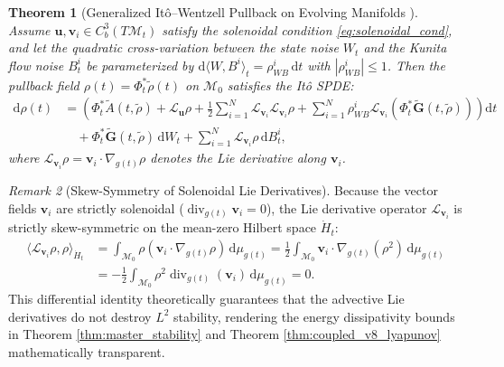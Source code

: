 \documentclass[11pt,a4paper,reqno]{article}
\newtheorem{theorem}{Theorem}[section]
\theoremstyle{definition}
\theoremstyle{remark}
\newtheorem{remark}[theorem]{Remark}
\begin{document}
\begin{theorem}[Generalized It\^o--Wentzell Pullback on Evolving Manifolds \cite{ananda2026stochastic_fluid_v2, krylov2011ito}]\label{thm:ito_wentzell}
Assume $\mathbf{u}, \mathbf{v}_i \in C_b^3(T\mathcal{M}_t)$ satisfy the solenoidal condition \eqref{eq:solenoidal_cond}, and let the quadratic cross-variation between the state noise $W_t$ and the Kunita flow noise $B_t^i$ be parameterized by $\mathrm{d}\langle W, B^i \rangle_t = \rho_{WB}^i\,\mathrm{d}t$ with $|\rho_{WB}^i| \le 1$. Then the pullback field $\rho(t) = \Phi_t^*\tilde{\rho}(t)$ on $\mathcal{M}_0$ satisfies the It\^o SPDE:
\begin{align}\label{eq:ito_wentzell_pullback}
  \mathrm{d}\rho(t) &= \left( \Phi_t^* \tilde{A}(t, \tilde{\rho}) + \mathcal{L}_{\mathbf{u}} \rho + \frac{1}{2} \sum_{i=1}^N \mathcal{L}_{\mathbf{v}_i} \mathcal{L}_{\mathbf{v}_i} \rho + \sum_{i=1}^N \rho_{WB}^i \mathcal{L}_{\mathbf{v}_i} \left(\Phi_t^* \tilde{\mathbf{G}}(t, \tilde{\rho})\right) \right) \mathrm{d}t \nonumber \\
  &\quad + \Phi_t^* \tilde{\mathbf{G}}(t, \tilde{\rho})\,\mathrm{d}W_t + \sum_{i=1}^N \mathcal{L}_{\mathbf{v}_i} \rho \,\mathrm{d}B_t^i,
\end{align}
where $\mathcal{L}_{\mathbf{v}_i}\rho = \mathbf{v}_i \cdot \nabla_{g(t)}\rho$ denotes the Lie derivative along $\mathbf{v}_i$.
\end{theorem}

\begin{remark}[Skew-Symmetry of Solenoidal Lie Derivatives]\label{rem:skew_symmetry}
Because the vector fields $\mathbf{v}_i$ are strictly solenoidal ($\operatorname{div}_{g(t)} \mathbf{v}_i = 0$), the Lie derivative operator $\mathcal{L}_{\mathbf{v}_i}$ is strictly skew-symmetric on the mean-zero Hilbert space $\dot{H}_t$:
\begin{align}\label{eq:skew_symmetry}
  \langle \mathcal{L}_{\mathbf{v}_i} \rho, \rho \rangle_{\dot{H}_t}
  &= \int_{\mathcal{M}_0} \rho (\mathbf{v}_i \cdot \nabla_{g(t)} \rho) \,\mathrm{d}\mu_{g(t)}
   = \frac{1}{2} \int_{\mathcal{M}_0} \mathbf{v}_i \cdot \nabla_{g(t)} (\rho^2) \,\mathrm{d}\mu_{g(t)} \nonumber \\
  &= -\frac{1}{2} \int_{\mathcal{M}_0} \rho^2 \operatorname{div}_{g(t)}(\mathbf{v}_i) \,\mathrm{d}\mu_{g(t)} = 0.
\end{align}
This differential identity theoretically guarantees that the advective Lie derivatives do not destroy $L^2$ stability, rendering the energy dissipativity bounds in Theorem \ref{thm:master_stability} and Theorem \ref{thm:coupled_v8_lyapunov} mathematically transparent.
\end{remark}
\end{document}
